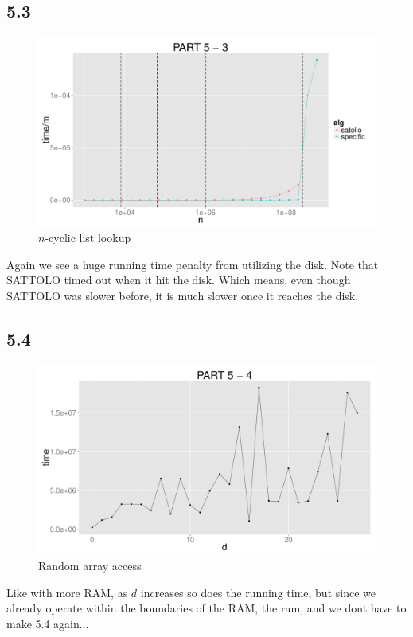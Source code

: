 \documentclass{article}
\begin{document}
\subsection*{5.3}
\begin{figure}[H]
    \centering
    \includegraphics[width=\textwidth]{images/part5_3.pdf}
    \caption{$n$-cyclic list lookup}
    \label{fig:awesome_image}
\end{figure}
Again we see a huge running time penalty from utilizing the disk. Note that 
SATTOLO timed out when it hit the disk. 
Which means, even though SATTOLO was slower before, it is much slower once it reaches the disk.
\newline
\subsection*{5.4}
\begin{figure}[H]
    \centering
    \includegraphics[width=\textwidth]{images/part5_4.pdf}
    \caption{Random array access}
    \label{fig:awesome_image}
\end{figure}
Like with more RAM, as $d$ increases so does the running time, but since we already operate within the boundaries of the RAM,
the ram, and we dont have to make 5.4 again...
\end{document}

